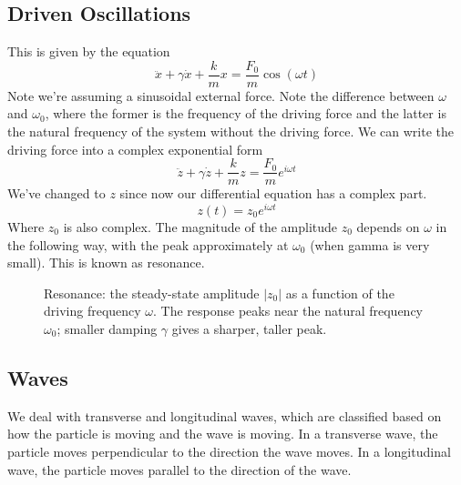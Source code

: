 \documentclass{report}
\numberwithin{equation}{section}
\begin{document}
\subsection{Driven Oscillations}
This is given by the equation
\begin{equation}
	\ddot{x} + \gamma \dot{x} +\frac{k}{m}x = \frac{F_0}{m}\cos(\omega t)
\end{equation}
Note we're assuming a sinusoidal external force. Note the difference between $\omega$ and $\omega_0$, where the former is the frequency of the driving force and the latter is the natural frequency of the system without the driving force. We can write the driving force into a complex exponential form
\begin{equation}
		\ddot{z} + \gamma \dot{z} +\frac{k}{m}z = \frac{F_0}{m}e^{i\omega t}
\end{equation}
We've changed to $z$ since now our differential equation has a complex part.
\begin{equation}
	z(t) = z_0e^{i\omega t}
\end{equation}
Where $z_0$ is also complex. The magnitude of the amplitude $z_0$ depends on $\omega$ in the following way, with the peak approximately at $\omega_0$ (when gamma is very small). This is known as resonance.

\begin{figure}[H]
\centering
{}
\caption{Resonance: the steady-state amplitude $|z_0|$ as a function of the
driving frequency $\omega$. The response peaks near the natural frequency
$\omega_0$; smaller damping $\gamma$ gives a sharper, taller peak.}
\label{fig:resonance}
\end{figure}
\subsection{Waves}
We deal with transverse and longitudinal waves, which are classified based on how the particle is moving and the wave is moving. In a transverse wave, the particle moves perpendicular to the direction the wave moves. In a longitudinal wave, the particle moves parallel to the direction of the wave.
\end{document}
